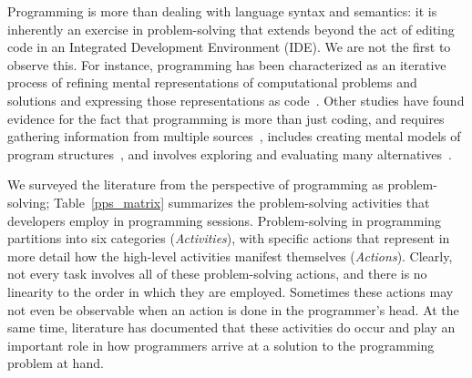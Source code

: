 Programming is more than dealing with language syntax and semantics: it is inherently an exercise in problem-solving that extends beyond the act of editing code in an Integrated Development Environment (IDE).
We are not the first to observe this.
For instance, programming has been characterized as an iterative process of refining mental representations of computational problems and solutions and expressing those representations as code~\cite{loksa2016programming}.
Other studies have found evidence for the fact that programming is more than just coding, and requires gathering information from multiple sources~\cite{sillito2008asking}, includes creating mental models of program structures~\cite{von1995comprehension}, and involves exploring and evaluating many alternatives~\cite{hartmann2008design}.


We surveyed the literature from the perspective of programming as problem-solving; Table~\ref{pps_matrix} summarizes the problem-solving activities that developers employ in programming sessions.
Problem-solving in programming partitions into six categories (\textit{Activities}), with specific actions  that represent in more detail how the high-level activities manifest themselves (\textit{Actions}).
Clearly, not every task involves all of these problem-solving actions, and there is no linearity to the order in which they are employed.
Sometimes these actions may not even be observable when an action is done in the programmer's head.
At the same time, literature has documented that these activities do occur and play an important role in how programmers arrive at a solution to the programming problem at hand.

